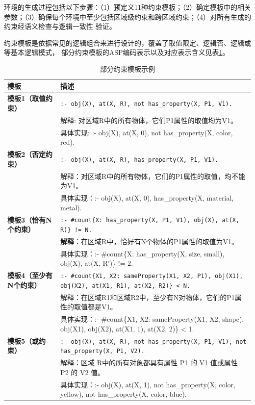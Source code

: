 环境的生成过程包括以下步骤：（1）预定义11种约束模板；（2）确定模板中的相关参数；（3）确保每个环境中至少包括区域级约束和跨区域约束；（4）对所有生成的约束经语义检查与逻辑一致性
验证。

约束模板是依据常见的逻辑组合来进行设计的，覆盖了取值限定、逻辑否、逻辑或等基本逻辑模式，
部分约束模板的ASP编码表示以及对应表示含义见表\ref{tab:asp_templates}。
\begin{table}[h]
    \centering
    \renewcommand{\arraystretch}{1.0}
    \begin{tabular}{|p{3cm}|p{12cm}|}
        \hline
        \textbf{模板} & \textbf{描述} \\
        \hline
        \textbf{模板1（取值约束）} & 
        \texttt{:- obj(X), at(X, R), not has\_property(X, P1, V1).} \\ 
        & 解释: 对区域R中的所有物体，它们P1属性的取值均为V1。 \\ 
        & 具体实现: :- obj(X), at(X, 0), not has\_property(X, color, red). \\
        \hline
        
        \textbf{模板2（否定约束）} & 
        \texttt{:- obj(X), at(X, R), has\_property(X, P1, V1).} \\ 
        & 解释：对区域R中的所有物体，它们的P1属性的取值，均不能为V1。 \\ 
        & 具体实现：:- obj(X), at(X, 0), has\_property(X, material, metal). \\
        \hline
        
        \textbf{模板3（恰有N个约束）} & 
        \texttt{:- \#count\{X: has\_property(X, P1, V1), obj(X), at(X, R)\} != N.} \\ 
        & \textbf{解释}：在区域R中，恰好有N个物体的P1属性的取值为V1。 \\ 
        & 具体实现：:- \#count\{X: has\_property(X, size, small), obj(X), at(X, R')\} != 2. \\
        \hline
        
        \textbf{模板4（至少有N个约束）} & 
        \texttt{:- \#count\{X1, X2: sameProperty(X1, X2, P1), obj(X1), obj(X2), at(X1, R1), at(X2, R2)\} < N.} \\ 
        & 解释：在区域R1和区域R2中，至少有N对物体，它们的P1属性的取值都是V1。 \\ 
        & 具体实现：:- \#count\{X1, X2: sameProperty(X1, X2, shape), obj(X1), obj(X2), at(X1, 1), at(X2, 2)\} < 1. \\
        \hline
        
        \textbf{模板5（或约束）} & 
        \texttt{:- obj(X), at(X, R), not has\_property(X, P1, V1), not has\_property(X, P1, V2).} \\ 
        & 解释：区域 R中的所有对象都具有属性 P1 的 V1 值或属性 P2 的 V2 值。 \\ 
        & 具体实现：:- obj(X), at(X, 1), not has\_property(X, color, yellow), not has\_property(X, color, blue). \\
        \hline
    \end{tabular}
    \caption{部分约束模板示例}
    \label{tab:asp_templates}
\end{table}

